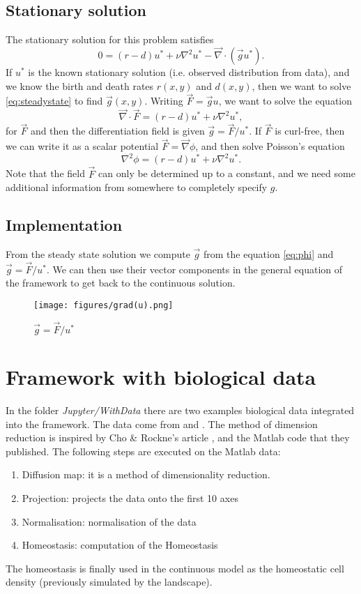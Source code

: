 \documentclass[11pt, oneside]{article}   	%
\newcommand{\grad}{\vec{\nabla}}
\begin{document}
\subsection{Stationary solution}
The stationary solution for this problem satisfies
\begin{equation}
0 = (r-d)u^* + \nu \nabla^2 u^* - \grad \cdot (\vec{g} u^*).
\end{equation}
If $u^*$ is the known stationary solution (i.e. observed distribution from data), and we know the birth and death rates $r(x,y)$ and $d(x,y)$, then we want to solve \eqref{eq:steadystate} to find $\vec{g}(x,y)$.
Writing $\vec{F} = \vec{g}u$, we want to solve the equation
\begin{equation}
\grad \cdot \vec{F} = (r-d)u^* + \nu \nabla^2 u^*,
\end{equation}
for $\vec{F}$ and then the differentiation field is given $\vec{g} = \vec{F}/u^*$.
If $\vec{F}$ is curl-free, then we can write it as a scalar potential $\vec{F} = \grad \phi$, and then solve Poisson's equation
\begin{equation}
\nabla^2 \phi = (r-d)u^* + \nu \nabla^2 u^*.
\label{eq:phi}
\end{equation}
Note that the field $\vec{F}$ can only be determined up to a constant, and we need some additional information from somewhere to completely specify $g$.
\subsection{Implementation}
From the steady state solution we compute $\vec{g}$ from the equation \ref{eq:phi} and $\vec{g} = \vec{F}/u^*$. We can then use their vector components in the general equation of the framework to get back to the continuous solution.

\begin{figure}[h!]
\centering
\texttt{[image: figures/grad(u).png]}
\caption{$\vec{g} = \vec{F}/u^*$}
\label{fig:binpos}
\end{figure}

\section{Framework with biological data}
In the folder \textit{Jupyter/WithData} there are two examples biological data integrated into the framework. The data come from  \cite{paul:Cell:2015} and  \cite{nestorowa:Blood:2016}. The method of dimension reduction is inspired by Cho \& Rockne's article \cite{cho:bioRxiv:2019}, and the Matlab code that they published. 
The following steps are executed on the Matlab data:
\begin{enumerate}
\item{Diffusion map}: it is a method of dimensionality reduction.
\item{Projection}: projects the data onto the first 10 axes
\item{Normalisation}: normalisation of the data
\item{Homeostasis}: computation of the Homeostasis
\end{enumerate}
The homeostasis is finally used in the continuous model as the homeostatic cell density (previously simulated by the landscape). 
\end{document}
